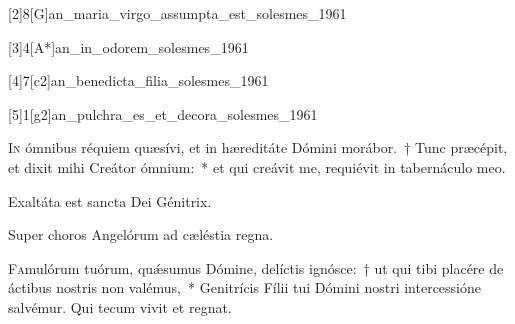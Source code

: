 \documentclass[vesperale_romanum.tex]{subfiles}
\begin{document}

\label{i_vesperis_15_aug}

 
 [2]{8}[G]{an_maria_virgo_assumpta_est_solesmes_1961}
 
[3]{4}[A*]{an_in_odorem_solesmes_1961}
  
   [4]{7}[c2]{an_benedicta_filia_solesmes_1961}
   
    [5]{1}[g2]{an_pulchra_es_et_decora_solesmes_1961}
    

\lettrine{I}{n} ómnibus réquiem quæsívi, et in hæreditáte Dómini morábor.~† Tunc præcépit, et dixit mihi Creátor ómnium:~* et qui
creávit me, requiévit in tabernáculo meo.

\amsrubrique

\vv Exaltáta est sancta Dei Génitrix.

\rr Super choros Angelórum ad cæléstia regna.
 
\label{an_virgo_prudentissima_solesmes_1961}

 
\oratio
 
\lettrine{F}{a}mulórum tuórum, quǽsumus Dómine, delíctis ignósce:~† ut qui tibi placére de áctibus nostris non valémus,~* Genitrícis Fílii tui Dómini nostri intercessióne salvémur. Qui tecum vivit et regnat.
 


\omniapraeter

\label{Exaltata}

\label{an_hodie_maria_virgo_caelos_solesmes_1961}
{}
 
\end{document}
